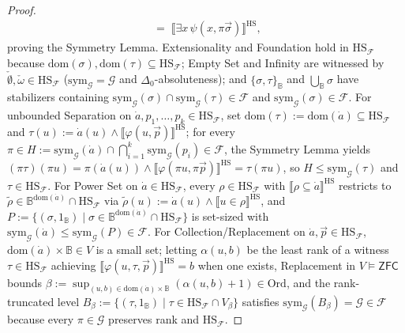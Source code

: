 \begin{proof}
\[\begin{aligned}
    \;=\; \llbracket \exists x\,\psi(x, \pi\vec{\sigma}) \rrbracket^{\mathrm{HS}},
  \end{aligned}
\]
proving the Symmetry Lemma. Extensionality and Foundation hold in $\mathrm{HS}_{\mathcal{F}}$ because $\mathrm{dom}(\sigma), \mathrm{dom}(\tau) \subseteq \mathrm{HS}_{\mathcal{F}}$; Empty Set and Infinity are witnessed by $\check{\emptyset}, \check{\omega} \in \mathrm{HS}_{\mathcal{F}}$ ($\mathrm{sym}_{\mathcal{G}} = \mathcal{G}$ and $\Delta_0$-absoluteness); and $\{\sigma, \tau\}_{\mathbb{B}}$ and $\bigcup_{\mathbb{B}} \sigma$ have stabilizers containing $\mathrm{sym}_{\mathcal{G}}(\sigma) \cap \mathrm{sym}_{\mathcal{G}}(\tau) \in \mathcal{F}$ and $\mathrm{sym}_{\mathcal{G}}(\sigma) \in \mathcal{F}$. For unbounded Separation on $\dot{a}, p_1, \dots, p_k \in \mathrm{HS}_{\mathcal{F}}$, set $\mathrm{dom}(\tau) := \mathrm{dom}(\dot{a}) \subseteq \mathrm{HS}_{\mathcal{F}}$ and $\tau(u) := \dot{a}(u) \wedge \llbracket \varphi(u, \vec{p}) \rrbracket^{\mathrm{HS}}$; for every $\pi \in H := \mathrm{sym}_{\mathcal{G}}(\dot{a}) \cap \bigcap_{i=1}^k \mathrm{sym}_{\mathcal{G}}(p_i) \in \mathcal{F}$, the Symmetry Lemma yields $(\pi\tau)(\pi u) = \pi(\dot{a}(u)) \wedge \llbracket \varphi(\pi u, \pi\vec{p}) \rrbracket^{\mathrm{HS}} = \tau(\pi u)$, so $H \le \mathrm{sym}_{\mathcal{G}}(\tau)$ and $\tau \in \mathrm{HS}_{\mathcal{F}}$. For Power Set on $\dot{a} \in \mathrm{HS}_{\mathcal{F}}$, every $\rho \in \mathrm{HS}_{\mathcal{F}}$ with $\llbracket \rho \subseteq \dot{a} \rrbracket^{\mathrm{HS}}$ restricts to $\tilde{\rho} \in \mathbb{B}^{\mathrm{dom}(\dot{a})} \cap \mathrm{HS}_{\mathcal{F}}$ via $\tilde{\rho}(u) := \dot{a}(u) \wedge \llbracket u \in \rho \rrbracket^{\mathrm{HS}}$, and $P := \{(\sigma, 1_{\mathbb{B}}) \mid \sigma \in \mathbb{B}^{\mathrm{dom}(\dot{a})} \cap \mathrm{HS}_{\mathcal{F}}\}$ is set-sized with $\mathrm{sym}_{\mathcal{G}}(\dot{a}) \le \mathrm{sym}_{\mathcal{G}}(P) \in \mathcal{F}$. For Collection/Replacement on $\dot{a}, \vec{p} \in \mathrm{HS}_{\mathcal{F}}$, $\mathrm{dom}(\dot{a}) \times \mathbb{B} \in V$ is a small set; letting $\alpha(u, b)$ be the least rank of a witness $\tau \in \mathrm{HS}_{\mathcal{F}}$ achieving $\llbracket \varphi(u, \tau, \vec{p}) \rrbracket^{\mathrm{HS}} = b$ when one exists, Replacement in $V \models \mathsf{ZFC}$ bounds $\beta := \sup_{(u,b) \in \mathrm{dom}(\dot{a}) \times \mathbb{B}} (\alpha(u, b) + 1) \in \mathrm{Ord}$, and the rank-truncated level $B_\beta := \{(\tau, 1_{\mathbb{B}}) \mid \tau \in \mathrm{HS}_{\mathcal{F}} \cap V_\beta\}$ satisfies $\mathrm{sym}_{\mathcal{G}}(B_\beta) = \mathcal{G} \in \mathcal{F}$ because every $\pi \in \mathcal{G}$ preserves rank and $\mathrm{HS}_{\mathcal{F}}$.


\end{proof}
